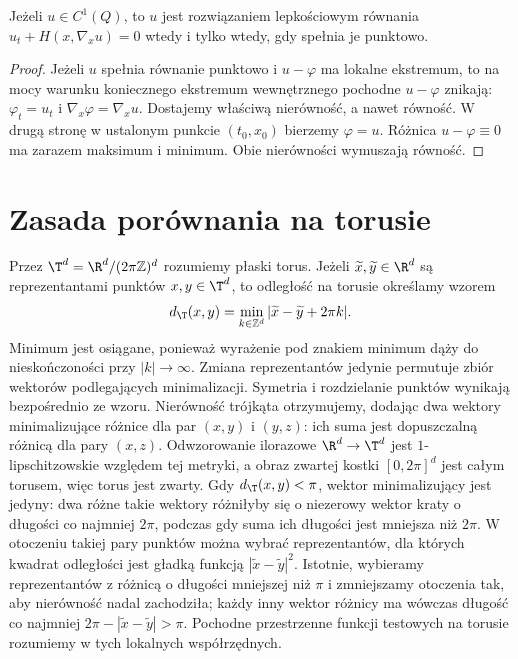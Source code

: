\begin{stwierdzenie}
\label{prop:pde23-smooth-visc}
Jeżeli $u\in C^1(Q)$, to $u$ jest rozwiązaniem
lepkościowym równania $u_t+H(x,\nabla_xu)=0$
wtedy i tylko wtedy, gdy spełnia je punktowo.
\end{stwierdzenie}
\begin{proof}
Jeżeli $u$ spełnia równanie punktowo i $u-\varphi$ ma
lokalne ekstremum, to na mocy warunku koniecznego
ekstremum wewnętrznego pochodne $u-\varphi$ znikają:
$\varphi_t=u_t$ i $\nabla_x\varphi=\nabla_xu$.
Dostajemy właściwą nierówność, a nawet równość.
W drugą stronę w ustalonym punkcie $(t_0,x_0)$
bierzemy $\varphi=u$. Różnica $u-\varphi\equiv0$
ma zarazem maksimum i minimum.
Obie nierówności wymuszają równość.
\end{proof}

\section{Zasada porównania na torusie}
Przez $\T^d=\R^d/(2\pi\mathbb Z)^d$ rozumiemy płaski torus.
Jeżeli $\widetilde x,\widetilde y\in\R^d$ są reprezentantami
punktów $x,y\in\T^d$, to odległość na torusie określamy wzorem
\[
 d_{\T}(x,y)=\min_{k\in\mathbb Z^d}
          |\widetilde x-\widetilde y+2\pi k|.
\]
Minimum jest osiągane, ponieważ wyrażenie pod znakiem
minimum dąży do nieskończoności przy $|k|\to\infty$.
Zmiana reprezentantów jedynie permutuje zbiór wektorów
podlegających minimalizacji. Symetria i rozdzielanie
punktów wynikają bezpośrednio ze wzoru.
Nierówność trójkąta otrzymujemy, dodając dwa
wektory minimalizujące różnice dla par $(x,y)$
i $(y,z)$: ich suma jest dopuszczalną różnicą
dla pary $(x,z)$. Odwzorowanie ilorazowe
$\R^d\to\T^d$ jest $1$-lipschitzowskie względem
tej metryki, a obraz zwartej kostki $[0,2\pi]^d$
jest całym torusem, więc torus jest zwarty. Gdy $d_{\T}(x,y)<\pi$,
wektor minimalizujący jest jedyny: dwa różne takie
wektory różniłyby się o niezerowy wektor kraty
o długości co najmniej $2\pi$, podczas gdy suma ich
długości jest mniejsza niż $2\pi$.
W otoczeniu takiej pary punktów można wybrać
reprezentantów, dla których kwadrat odległości
jest gładką funkcją $|\widetilde x-\widetilde y|^2$.
Istotnie, wybieramy reprezentantów z różnicą
o długości mniejszej niż $\pi$ i zmniejszamy
otoczenia tak, aby nierówność nadal zachodziła;
każdy inny wektor różnicy ma wówczas długość
co najmniej $2\pi-|\widetilde x-\widetilde y|>\pi$.
Pochodne przestrzenne funkcji testowych na torusie
rozumiemy w tych lokalnych współrzędnych.

